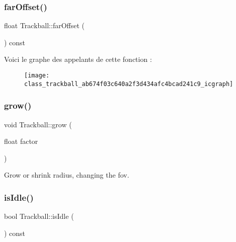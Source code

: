 \mbox{\label{class_trackball_ab674f03c640a2f3d434afc4bcad241c9}} 
\subsubsection{\texorpdfstring{far\+Offset()}{farOffset()}}
{\footnotesize\ttfamily float Trackball\+::far\+Offset (\begin{DoxyParamCaption}{ }\end{DoxyParamCaption}) const}

Voici le graphe des appelants de cette fonction \+:
\nopagebreak
\begin{figure}[H]
\begin{center}
\leavevmode
\texttt{[image: class\_trackball\_ab674f03c640a2f3d434afc4bcad241c9\_icgraph]}
\end{center}
\end{figure}
\mbox{\label{class_trackball_a4ac38af7646e5998ac341051d0458c58}} 
\subsubsection{\texorpdfstring{grow()}{grow()}}
{\footnotesize\ttfamily void Trackball\+::grow (\begin{DoxyParamCaption}\item[{float}]{factor }\end{DoxyParamCaption})}



Grow or shrink radius, changing the fov. 

\mbox{\label{class_trackball_a29102c33e22690b2ad3990c516800220}} 
\subsubsection{\texorpdfstring{is\+Idle()}{isIdle()}}
{\footnotesize\ttfamily bool Trackball\+::is\+Idle (\begin{DoxyParamCaption}{ }\end{DoxyParamCaption}) const}

\mbox{\label{class_trackball_a3712c12a5a5468301593a01b0df4c6be}} 
